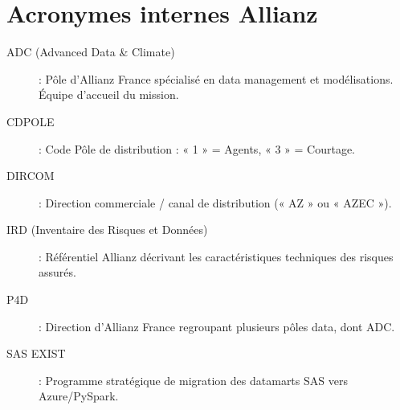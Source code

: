 \section*{Acronymes internes Allianz}

\begin{description}
    \item[ADC (Advanced Data \& Climate)] : Pôle d'Allianz France spécialisé en data management et modélisations. Équipe d'accueil du mission.
    \item[CDPOLE] : Code Pôle de distribution : « 1 » = Agents, « 3 » = Courtage.
    \item[DIRCOM] : Direction commerciale / canal de distribution (« AZ » ou « AZEC »).
    \item[IRD (Inventaire des Risques et Données)] : Référentiel Allianz décrivant les caractéristiques techniques des risques assurés.
    \item[P4D] : Direction d'Allianz France regroupant plusieurs pôles data, dont ADC.
    \item[SAS EXIST] : Programme stratégique de migration des datamarts SAS vers Azure/PySpark.
\end{description}


